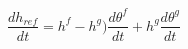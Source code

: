 \begin{equation}
\frac{dh_{ref}}{dt} = h^f-h^g) \frac{d\theta^f }{dt} + h^g \frac{d\theta^g }{dt}
\end{equation}